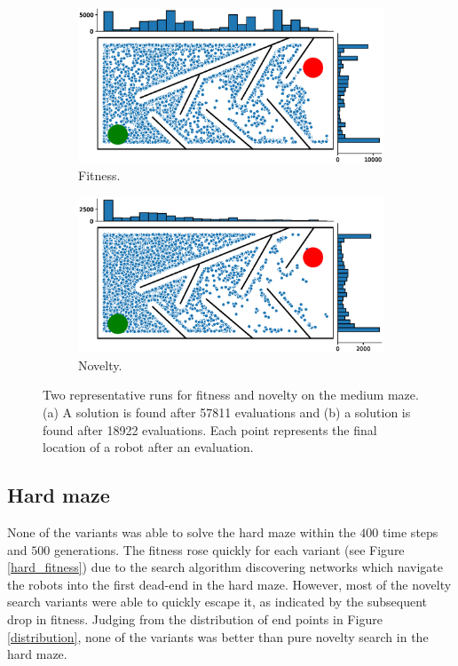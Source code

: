 \begin{figure}[H]
    \begin{mdframed}
        \begin{subfigure}[b]{0.45\textwidth}
            \includegraphics[scale=0.3]{resources/mazes/fitness_single.eps}
            \caption{Fitness.}
            \label{fitness_only}
        \end{subfigure}
        \begin{subfigure}[b]{0.5\textwidth}
            \includegraphics[scale=0.3]{resources/mazes/novelty_single.eps}
            \caption{Novelty.}
            \label{novelty_only}
        \end{subfigure}
    \end{mdframed}
    \caption{Two representative runs for fitness and novelty on the medium maze. (a) A solution is found after 57811 evaluations
    and (b) a solution is found after 18922 evaluations. Each point represents the final location
    of a robot after an evaluation.}
    \label{typical_runs}
\end{figure}

\subsection{Hard maze}
None of the variants was able to solve the hard maze within the $400$ time steps and $500$ generations.
The fitness rose quickly for each variant (see Figure \ref{hard_fitness}) due to the search algorithm
discovering networks which navigate the robots into the first dead-end in the hard maze.
However, most of the novelty search variants
were able to quickly escape it, as indicated by the subsequent drop in fitness.
Judging from the distribution of end points in Figure \ref{distribution}, none of the variants
was better than pure novelty search in the hard maze.

